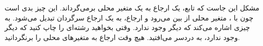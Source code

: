 \section{}
\paragraph{}\label{answer:30}
مشکل این جاست که تابع، یک ارجاع به یک متغیر محلی برمی‌گرداند. این چیز بدی است چون با ، متغیر محلی از بین می‌رود و ارجاع، به یک ارجاع سرگردان تبدیل می‌شود. به چیزی اشاره می‌کند که دیگر وجود ندارد. وقتی بخواهید رشته‌ای را چاپ کنید که دیگر وجود ندارد، به دردسر می‌افتید. هیچ وقت ارجاع به متغیرهای محلی را برنگردانید.